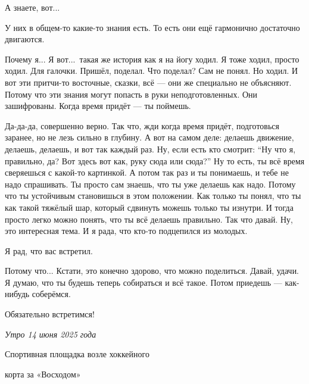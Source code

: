 \I
А знаете, вот...

\M
У них в общем-то какие-то знания есть. То есть они ещё гармонично достаточно двигаются.

\I
Почему я... Я вот...\
такая же история как я на йогу ходил.
Я тоже ходил, просто ходил.
Для галочки.
Пришёл, поделал. Что поделал? Сам не понял.
Но ходил.
И вот эти притчи-то восточные, сказки, всё --- они же специально не объясняют.
Потому что эти знания могут попасть в руки неподготовленных.
Они зашифрованы.
Когда время придёт --- ты поймешь.

\M
Да-да-да, совершенно верно.
Так что, жди когда время придёт, подготовься заранее, но не лезь сильно в глубину.
А вот на самом деле: делаешь движение, делаешь, делаешь, и вот так каждый раз.
Ну, если есть кто смотрит: ``Ну что я, правильно, да? Вот здесь вот как, руку сюда или сюда?''
Ну то есть, ты всё время сверяешься с какой-то картинкой.
А потом так {\csc раз} и ты понимаешь, и тебе не надо спрашивать.
Ты просто сам знаешь, что ты уже делаешь как надо.
Потому что ты устойчивым становишься в этом положении.
Как только ты понял, что ты как такой тяжёлый шар, который сдвинуть можешь только ты изнутри.
И тогда просто легко можно понять, что ты всё делаешь правильно. Так что давай.
Ну, это интересная тема.
И я рада, что кто-то подцепился из молодых.

\I
Я рад, что вас встретил.

\M
Потому что... Кстати, это конечно здорово, что можно
поделиться. Давай, удачи. Я думаю, что ты будешь теперь собираться и всё такое.
Потом приедешь --- как-нибудь соберёмся.

\I
Обязательно встретимся!

\kern2cm
\it
\lineskip=7pt
\hskip6cm Утро 14 июня 2025 года \par
\hskip4cm Спортивная площадка возле хоккейного \par
\hskip7.5cm корта за «Восходом» \par
\vfil
\eject
\shipout\vbox{}
\bye
